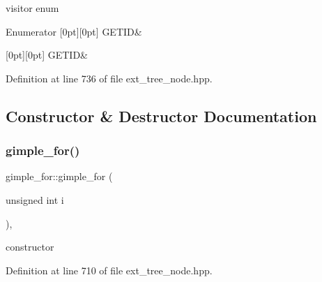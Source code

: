 visitor enum 

\begin{DoxyEnumFields}{Enumerator}
[0pt][0pt]{}\mbox{\label{structgimple__for_a9f1d57e1e9600928ebaad063f76a8c9ea179f1a5a5820a76fb24ecd5341df4861}} 
G\+E\+T\+ID&\\
\hline

[0pt][0pt]{}\mbox{\label{structgimple__for_a9f1d57e1e9600928ebaad063f76a8c9ea179f1a5a5820a76fb24ecd5341df4861}} 
G\+E\+T\+ID&\\
\hline

\end{DoxyEnumFields}


Definition at line 736 of file ext\+\_\+tree\+\_\+node.\+hpp.



\subsection{Constructor \& Destructor Documentation}
\mbox{\label{structgimple__for_a212f7b45c5b79e8dd70ab01d70b91f5a}} 
\subsubsection{\texorpdfstring{gimple\+\_\+for()}{gimple\_for()}}
{\footnotesize\ttfamily gimple\+\_\+for\+::gimple\+\_\+for (\begin{DoxyParamCaption}\item[{unsigned int}]{i }\end{DoxyParamCaption})\hspace{0.3cm}{\ttfamily [inline]}, {\ttfamily [explicit]}}



constructor 



Definition at line 710 of file ext\+\_\+tree\+\_\+node.\+hpp.



